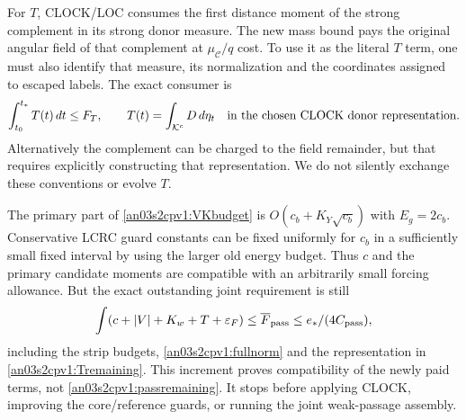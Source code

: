 \documentclass[11pt]{article}
\theoremstyle{remark}\newtheorem{remark}[theorem]{Remark}
\newcommand{\dd}{\,d}
\newcommand{\KK}{\mathcal K}
\newcommand{\eps}{\varepsilon}
\begin{document}
For $T$, CLOCK/LOC consumes the first distance moment of the
strong complement in its strong donor measure. The new mass
bound pays the original angular field of that complement at
$\mu_{\mathcal C}/q$ cost. To use it as the literal $T$ term,
one must also identify that measure, its normalization and the
coordinates assigned to escaped labels. The exact consumer is
\begin{equation}
 \int_{t_0}^{t_*}T(t)\dd t\le F_T,
 \qquad T(t)=\int_{\KK^c}D\dd\eta_t
 \quad\hbox{in the chosen CLOCK donor representation}.
 \label{an03s2cpv1:Tremaining}
\end{equation}
Alternatively the complement can be charged to the field
remainder, but that requires explicitly constructing that
representation. We do not silently exchange these conventions
or evolve $T$.

The primary part of \eqref{an03s2cpv1:VKbudget} is
$O(c_b+K_Y\sqrt{c_b})$ with $E_g=2c_b$. Conservative LCRC
guard constants can be fixed uniformly for $c_b$ in a sufficiently
small fixed interval by using the larger old energy budget.
Thus $c$ and the primary candidate moments are compatible with
an arbitrarily small forcing allowance. But the exact outstanding
joint requirement is still
\begin{equation}
 \int(c+|V|+K_w+T+\eps_F)
 \le\overline F_{\rm pass}\le e_*/(4C_{\rm pass}),
 \label{an03s2cpv1:passremaining}
\end{equation}
including the strip budgets, \eqref{an03s2cpv1:fullnorm} and
the representation in \eqref{an03s2cpv1:Tremaining}.
This increment proves compatibility of the newly paid terms,
not \eqref{an03s2cpv1:passremaining}. It stops before applying
CLOCK, improving the core/reference guards, or running the
joint weak-passage assembly.
\end{document}
